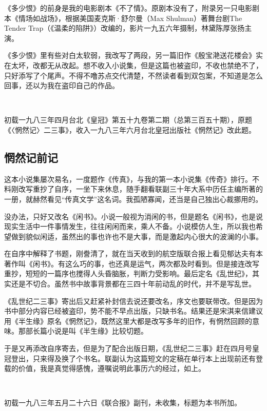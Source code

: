 \par 《多少恨》的前身是我的电影剧本《不了情》。原剧本没有了，附录另一只电影剧本《情场如战场》，根据美国麦克斯·舒尔曼（Max Shulman）著舞台剧The Tender Trap（《温柔的陷阱》）改编的，影片一九五六年摄制，林黛陈厚张扬主演。
\par 《多少恨》里有些对白太软弱，我改写了两段，另一篇旧作《殷宝滟送花楼会》实在太坏，改都无从改起。想不收入小说集，但是这篇也被盗印，不收也禁绝不了，只好添写了个尾声。不得不噜苏点交代清楚，不然读者看到双包案，不知道是怎么回事，还以为我在盗印自己的作品。
\par  
\par *初载一九八三年四月台北《皇冠》第五十九卷第二期（总第三百五十期），原题《〈惘然记〉二三事》，收入一九八三年六月台北皇冠出版社《惘然记》改此题。



\subsection{惘然记前记}


\par 这本小说集屡次易名，一度题作《传真》，与我的第一本小说集《传奇》排行。不料刚改写重抄了自序，一坐下来休息，随手翻看联副三十年大系中历任主编所著的一册，就赫然看见“传真文学”这名词。我孤陋寡闻，还当是自己独出心裁挪用的。
\par 没办法，只好又改名《闲书》。小说一般视为消闲的书，但是题名《闲书》，也是说现实生活中一件事情发生，往往闲闲而来，乘人不备。小说模仿人生，所以我也希望做到貌似闲适，虽然出的事也许也不是大事，而是激起内心很大的波澜的小事。
\par 在自序中解释了书题，刚誊清了，就在当天收到的航空版联合报上看见郁达夫有本著作叫《闲书》。有这么巧的事，也还真是运气，两次都及时看到。但是接连改写重抄，短短的一篇序也搅得人头昏脑胀，判断力受影响。最后定名《乱世纪》，其实还是不切合。虽然书中故事背景都在三四十年前动乱的时代，并不是写乱世。
\par 《乱世纪二三事》寄出后又赶紧补封信去说还要改名，序文也要联带改。但是因为书中部分内容已经被盗印，势不能不早点出版，只缺书名。结果还是宋淇来信建议用《半生缘》原名《惘然记》，既然这里大都是改写多年的旧作，有惘然回顾的意味。那部长篇小说是叫《半生缘》比较切题。
\par 于是又再添改自序寄去，但是为了配合出版日期，《乱世纪二三事》赶在四月号皇冠登出，只来得及换了个书名。联副认为这篇短文的定稿在单行本上出现前还有登载的价值，我是真觉得感愧，遵嘱说明此事历六的经过，如上。
\par  
\par *初载一九八三年五月二十六日《联合报》副刊，未收集，标题为本书所加。



